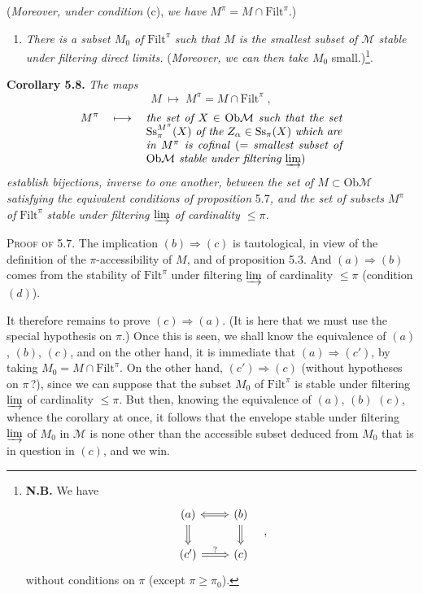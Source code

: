 \documentclass[11pt]{article}
\newcommand{\printedpage}[1]{\marginpar{\footnotesize p.~#1}}
\newcommand{\msp}[1]{\marginpar{\footnotesize [#1]}}
\newcommand{\Filt}{\mathrm{Filt}}
\newcommand{\Ob}{\mathrm{Ob}}
\newcommand{\Ss}{\mathrm{Ss}}
\newcommand{\M}{\mathcal{M}}
\begin{document}
(\textit{Moreover, under condition} (c), \textit{we have}
\printedpage{35}
\msp{page 58}
$M^\pi = M \cap \Filt^\pi$.)
\begin{enumerate}[label={}]
\item[c$'$)] \textit{There is a subset $M_0$ of} $\Filt^\pi$ \textit{such that $M$ is the smallest subset of $\M$ stable under filtering direct limits.} (\textit{Moreover, we can then take $M_0$} small.)\footnote[22]{\textbf{N.B.} We have
\[
\begin{tikzcd}[ampersand replacement=\&]
(a) \arrow[r, Leftrightarrow] \arrow[d, Rightarrow] \& (b) \arrow[d, Rightarrow] \\
(c') \arrow[r, Rightarrow, "?"] \& (c)
\end{tikzcd}
\quad ,
\]
without conditions on $\pi$ (except $\pi \geq \pi_0$).}.
\end{enumerate}

\textbf{Corollary 5.8.} \textit{The maps}
\[
M \;\longmapsto\; M^\pi = M \cap \Filt^\pi \;,
\]
\[
M^\pi \quad\longmapsto\quad \parbox[t]{0.5\textwidth}{\textit{the set of $X \in \Ob\M$ such that the set $\Ss_\pi^{M^\pi}(X)$ of the $Z_\alpha \in \Ss_\pi(X)$ which are in $M^\pi$ is cofinal} (= \textit{smallest subset of $\Ob\M$ stable under filtering $\varinjlim$})}
\]
\textit{establish bijections, inverse to one another, between the set of $M \subset \Ob\M$ satisfying the equivalent conditions of proposition} 5.7\textit{, and the set of subsets $M^\pi$ of} $\Filt^\pi$ \textit{stable under filtering $\varinjlim$ of cardinality $\leq \pi$.}

\textsc{Proof of} 5.7. The implication $(b) \Longrightarrow (c)$ is tautological, in view of the definition of the $\pi$-accessibility of $M$, and of proposition 5.3. And $(a) \Longrightarrow (b)$ comes from the stability of $\Filt^\pi$ under filtering $\varinjlim$ of cardinality $\leq \pi$ (condition $(d)$).

It therefore remains to prove $(c) \Longrightarrow (a)$. (It is here that we must use the special hypothesis on $\pi$.) Once this is seen, we shall know the equivalence of $(a)$, $(b)$, $(c)$, and on the other hand, it is immediate that $(a) \Longrightarrow (c')$, by
\msp{page 59}
taking $M_0 = M \cap \Filt^\pi$. On the other hand, $(c') \Longrightarrow (c)$ (without hypotheses on $\pi\,$?), since we can suppose that the subset $M_0$ of $\Filt^\pi$ is stable under filtering $\varinjlim$ of cardinality $\leq \pi$. But then, knowing the equivalence of $(a)$, $(b)$ $(c)$, whence the corollary at once, it follows that the envelope stable under filtering $\varinjlim$ of $M_0$ in $\M$ is none other than the accessible subset deduced from $M_0$ that is in question in $(c)$, and we win. %
\end{document}
